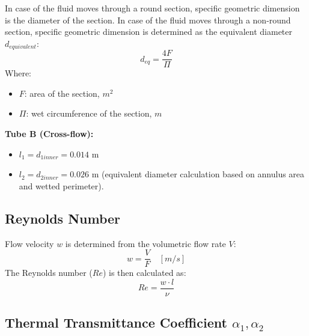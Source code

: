 In case of the fluid moves through a round section, specific geometric dimension is the diameter of the section. In case of the fluid moves through a non-round section, specific geometric dimension is determined as the equivalent diameter $d_{equivalent}$:
\begin{equation}
    d_{eq} = \frac{4F}{\Pi}
\end{equation}
Where:
\begin{itemize}
    \item $F$: area of the section, $m^2$
    \item $\Pi$: wet circumference of the section, $m$
\end{itemize}

\textbf{Tube B (Cross-flow):}
\begin{itemize}
    \item $l_1 = d_{1inner} = 0.014 \text{ m}$
    \item $l_2 = d_{2inner} = 0.026 \text{ m}$ (equivalent diameter calculation based on annulus area and wetted perimeter).
\end{itemize}

\subsection{Reynolds Number}\label{re-number}

Flow velocity $w$ is determined from the volumetric flow rate $V$:
\begin{equation}
    w = \frac{V}{F} \quad [m/s]
\end{equation}
The Reynolds number ($Re$) is then calculated as:
\begin{equation}
    Re = \frac{w \cdot l}{\nu}
\end{equation}

\subsection{Thermal Transmittance Coefficient $\alpha_1, \alpha_2$}\label{thermal-trans-alpha}

